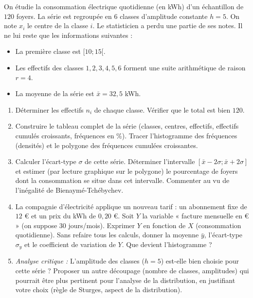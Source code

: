 \documentclass[11pt]{article}
\begin{document}
\begin{exercice}
\label{exo:reconstitution}
On étudie la consommation électrique quotidienne (en kWh) d'un échantillon de $120$ foyers. La série est regroupée en $6$ classes d'amplitude constante $h = 5$. On note $x_i$ le centre de la classe $i$. Le statisticien a perdu une partie de ses notes. Il ne lui reste que les informations suivantes :
\begin{itemize}
    \item La première classe est $[10 ; 15[$.
    \item Les effectifs des classes $1, 2, 3, 4, 5, 6$ forment une suite arithmétique de raison $r = 4$.
    \item La moyenne de la série est $\bar{x} = 32,5$ kWh.
\end{itemize}

\begin{enumerate}
    \item Déterminer les effectifs $n_i$ de chaque classe. Vérifier que le total est bien $120$.
    \item Construire le tableau complet de la série (classes, centres, effectifs, effectifs cumulés croissants, fréquences en \%). Tracer l'histogramme des fréquences (densités) et le polygone des fréquences cumulées croissantes.
    \item Calculer l'écart-type $\sigma$ de cette série. Déterminer l'intervalle $[\bar{x} - 2\sigma ; \bar{x} + 2\sigma]$ et estimer (par lecture graphique sur le polygone) le pourcentage de foyers dont la consommation se situe dans cet intervalle. Commenter au vu de l'inégalité de Bienaymé-Tchébychev.
    \item La compagnie d'électricité applique un nouveau tarif : un abonnement fixe de $12$ € et un prix du kWh de $0,20$ €. Soit $Y$ la variable « facture mensuelle en € » (on suppose $30$ jours/mois). Exprimer $Y$ en fonction de $X$ (consommation quotidienne). Sans refaire tous les calculs, donner la moyenne $\bar{y}$, l'écart-type $\sigma_y$ et le coefficient de variation de $Y$. Que devient l'histogramme ?
    \item \textit{Analyse critique :} L'amplitude des classes ($h=5$) est-elle bien choisie pour cette série ? Proposer un autre découpage (nombre de classes, amplitudes) qui pourrait être plus pertinent pour l'analyse de la distribution, en justifiant votre choix (règle de Sturges, aspect de la distribution).
\end{enumerate}
\end{exercice}
\end{document}
